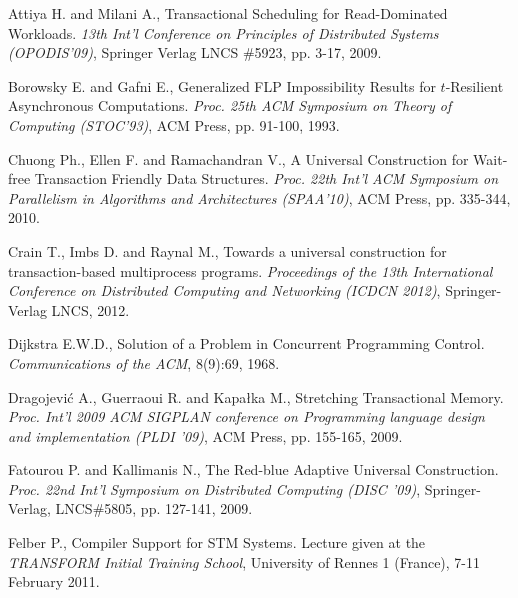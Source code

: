 \begin{thebibliography}{99}
{%
Attiya H. and Milani A., 
Transactional Scheduling for Read-Dominated Workloads. 
{\it 13th Int'l Conference on  Principles of Distributed Systems
(OPODIS'09)},  Springer Verlag  LNCS \#5923, pp. 3-17, 2009. 


Borowsky E. and Gafni E., 
Generalized FLP Impossibility Results for $t$-Resilient Asynchronous
Computations.
{\it Proc. 25th ACM  Symposium on Theory of Computing (STOC'93)}, 
ACM Press, pp. 91-100, 1993.


Chuong Ph., Ellen F. and Ramachandran V.,
A Universal Construction for Wait-free Transaction Friendly Data Structures.
{\it Proc. 22th  Int'l  ACM Symposium on Parallelism in Algorithms 
and Architectures   (SPAA'10)},  ACM Press, pp. 335-344,  2010. 

Crain T., Imbs D. and Raynal M.,
Towards a universal construction for transaction-based multiprocess programs.
{\it Proceedings of the 13th International Conference on Distributed Computing and Networking (ICDCN 2012)}, 
Springer-Verlag LNCS, 2012.


Dijkstra E.W.D., 
Solution of a Problem in Concurrent Programming Control.
{\it  Communications of the  ACM}, 8(9):69, 1968.


Dragojevi\'{c} A., Guerraoui R. and  Kapa\l{}ka M., 
Stretching Transactional Memory. 
{\it  Proc. Int'l  2009 ACM SIGPLAN conference on Programming
 language design and implementation (PLDI '09)},  
ACM Press, pp. 155-165,  2009. 



Fatourou P. and Kallimanis N., 
The Red-blue Adaptive Universal Construction. 
{\it  Proc. 22nd  Int'l  Symposium on Distributed Computing
(DISC '09)},  Springer-Verlag, LNCS\#5805, pp. 127-141,  2009. 




Felber P., 
Compiler Support for STM Systems. 
Lecture given at the  {\it TRANSFORM  Initial Training School},  University
of Rennes  1 (France), 7-11 February 2011. 




}
\end{thebibliography}
